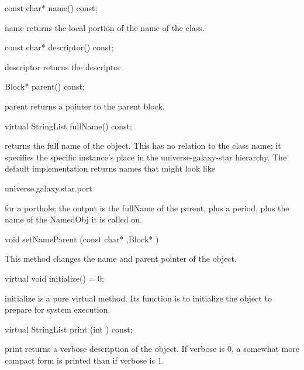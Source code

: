 \begin{example}
const char* name() const;
\end{example}

name returns the local portion of the name of the class.

\begin{example}
const char* descriptor() const;
\end{example}

descriptor returns the descriptor.

\begin{example}
Block* parent() const;
\end{example}

parent returns a pointer to the parent block.

\begin{example}
virtual StringList fullName() const;
\end{example}

 returns the full name of the object.  This has no
relation to the class name; it specifies the specific instance's place
in the universe-galaxy-star hierarchy.  The default
implementation returns names that might look like

\begin{example}
universe.galaxy.star.port
\end{example}

for a porthole; the output is the fullName of the parent, plus a period,
plus the name of the NamedObj it is called on.

\begin{example}
void setNameParent (const char* ,Block* )
\end{example}

This method changes the name and parent pointer of the object.

\begin{example}
virtual void initialize() = 0;
\end{example}

initialize is a pure virtual method.  Its function is to initialize the
object to prepare for system execution.

\begin{example}
virtual StringList print (int ) const;
\end{example}

print returns a verbose description of the object.  If verbose is 0, a
somewhat more compact form is printed than if verbose is 1.

